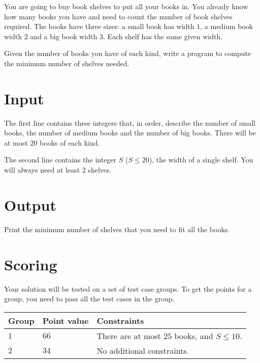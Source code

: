 You are going to buy book shelves to put all your books in.
You already know how many books you have and need to count the number of book shelves required.
The books have three sizes: a small book has width $1$, a medium book width $2$ and a big book width $3$.
Each shelf has the same given width.

Given the number of books you have of each kind, write a program to compute the minimum number of shelves needed.

\section*{Input}
The first line contains three integers that, in order, describe the number of small books, the number of medium books and the number of big books.
There will be at most $20$ books of each kind.

The second line contains the integer $S$ ($S \le 20$), the width of a single shelf.
You will always need at least $2$ shelves.

\section*{Output}
Print the minimum number of shelves that you need to fit all the books.

\section*{Scoring}
Your solution will be tested on a set of test case groups.
To get the points for a group, you need to pass all the test cases in the group.


\noindent
\begin{tabular}{| l | l | p{12cm} |}
  \hline
  \textbf{Group} & \textbf{Point value} & \textbf{Constraints} \\ \hline
  $1$    & $66$        & There are at most $25$ books, and $S \le 10$. \\ \hline 
  $2$    & $34$        & No additional constraints. \\ \hline
\end{tabular}



